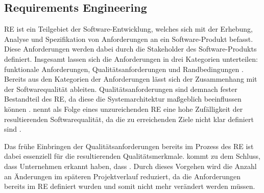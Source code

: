 \subsection{Requirements Engineering}
\ac{RE} ist ein Teilgebiet der Software-Entwicklung, welches sich mit der Erhebung, Analyse und Spezifikation von Anforderungen an ein Software-Produkt befasst.
Diese Anforderungen werden dabei durch die Stakeholder des Software-Produkts definiert.
Insgesamt lassen sich die Anforderungen in drei Kategorien unterteilen: funktionale Anforderungen, Qualitätsanforderungen und Randbedingungen \autocite[vgl.][S. 3]{pohl_basiswissen_2021}.
\newparagraph
Bereits aus den Kategorien der Anforderungen lässt sich der Zusammenhang mit der Softwarequalität ableiten.
Qualitätsanforderungen sind demnach fester Bestandteil des \ac{RE}, da diese die Systemarchitektur maßgeblich beeinflussen können \autocite[vgl.][S. 3-4]{pohl_basiswissen_2021}.
\citeauthor{ebert_systematisches_2019} nennt als Folge eines unzureichenden \ac{RE} eine hohe Zufälligkeit der resultierenden Softwarequalität, da die zu erreichenden Ziele nicht klar definiert sind \autocite[vgl.][S. 51]{ebert_systematisches_2019}. 

Das frühe Einbringen der Qualitätsanforderungen bereits im Prozess des \ac{RE} ist dabei essenziell für die resultierenden Qualitätsmerkmale.
\citeauthor{ebert_systematisches_2019} kommt zu dem Schluss, dass Unternehmen erkannt haben, dass  \autocite[S. 66]{ebert_systematisches_2019}.
Durch dieses Vorgehen wird die Anzahl an Änderungen im späteren Projektverlauf reduziert, da die Anforderungen bereits im \ac{RE} definiert wurden und somit nicht mehr verändert werden müssen.

